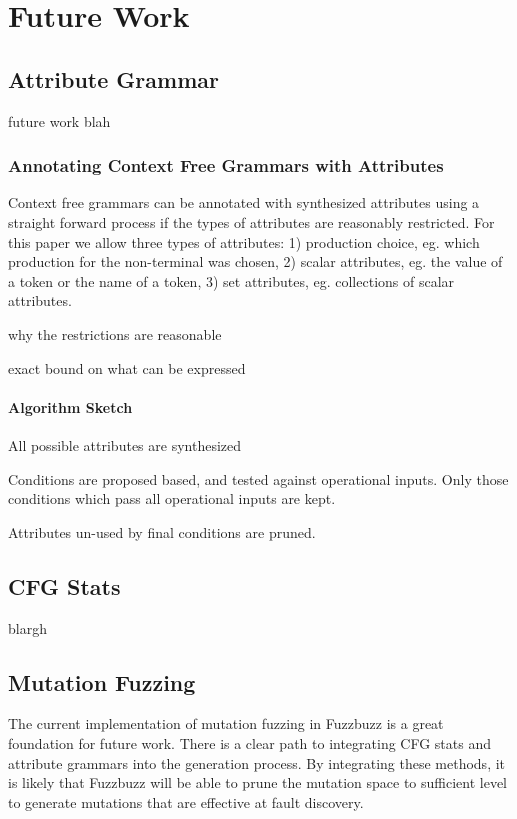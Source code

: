 \section{Future Work}
\subsection{Attribute Grammar}
future work blah
\subsubsection{Annotating Context Free Grammars with Attributes}

Context free grammars can be annotated with synthesized attributes using a
straight forward process if the types of attributes are reasonably restricted.
For this paper we allow three types of attributes: 1) production choice, eg.
which production for the non-terminal was chosen, 2) scalar attributes, eg. the
value of a token or the name of a token, 3) set attributes, eg. collections of
scalar attributes. 

why the restrictions are reasonable 

exact bound on what can be expressed

\paragraph{Algorithm Sketch}

All possible attributes are synthesized

Conditions are proposed based, and tested against operational inputs. Only those
conditions which pass all operational inputs are kept.

Attributes un-used by final conditions are pruned.

\subsection{CFG Stats}
blargh
\subsection{Mutation Fuzzing}
The current implementation of mutation fuzzing in Fuzzbuzz is a great
foundation for future work. There is a clear path to integrating CFG
stats and attribute grammars into the generation process. By
integrating these methods, it is likely that Fuzzbuzz will be able to
prune the mutation space to sufficient level to generate mutations
that are effective at fault discovery.


